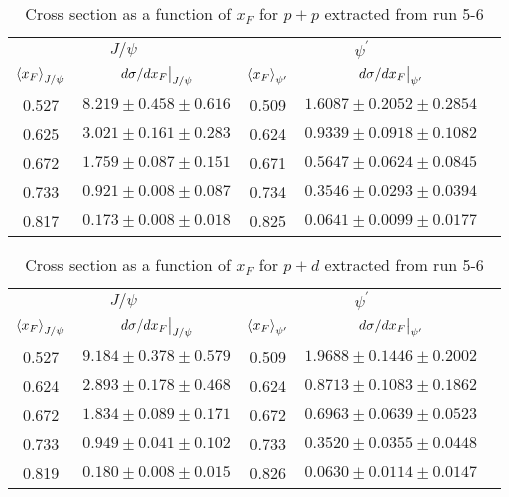 \documentclass[../main.tex]{subfiles}
\begin{document}
\begin{table}[h!]
\centering
\caption{Cross section as a function of $x_F$ for $p+p$ extracted from run 5-6}
\begin{tabular}{cc|ccc}
\hline
\multicolumn{2}{c|}{$J/\psi$}                               & \multicolumn{2}{c}{$\psi^{\prime}$}                                &  \\ \cline{1-4}
$\expval{x_F}_{J/\psi}$    & $\eval{d\sigma/dx_F}_{J/\psi}$ & $\expval{x_F}_{\psi^\prime}$ & $\eval{d\sigma/dx_F}_{\psi^\prime}$ &  \\ \cline{1-4}
\multicolumn{1}{c|}{0.527} & $8.219\pm0.458\pm0.616$        & \multicolumn{1}{c|}{0.509}   & $1.6087\pm0.2052\pm0.2854$          &  \\
\multicolumn{1}{c|}{0.625} & $3.021\pm0.161\pm0.283$        & \multicolumn{1}{c|}{0.624}   & $0.9339\pm0.0918\pm0.1082$          &  \\
\multicolumn{1}{c|}{0.672} & $1.759\pm0.087\pm0.151$        & \multicolumn{1}{c|}{0.671}   & $0.5647\pm0.0624\pm0.0845$          &  \\
\multicolumn{1}{c|}{0.733} & $0.921\pm0.008\pm0.087$        & \multicolumn{1}{c|}{0.734}   & $0.3546\pm0.0293\pm0.0394$          &  \\
\multicolumn{1}{c|}{0.817} & $0.173\pm0.008\pm0.018$        & \multicolumn{1}{c|}{0.825}   & $0.0641\pm0.0099\pm0.0177$          &  \\ \cline{1-4}
\end{tabular}
\end{table}
\begin{table}[h!]
\centering
\caption{Cross section as a function of $x_F$ for $p+d$ extracted from run 5-6}
\begin{tabular}{cc|ccc}
\hline
\multicolumn{2}{c|}{$J/\psi$}                               & \multicolumn{2}{c}{$\psi^{\prime}$}                                &  \\ \cline{1-4}
$\expval{x_F}_{J/\psi}$    & $\eval{d\sigma/dx_F}_{J/\psi}$ & $\expval{x_F}_{\psi^\prime}$ & $\eval{d\sigma/dx_F}_{\psi^\prime}$ &  \\ \cline{1-4}
\multicolumn{1}{c|}{0.527} & $9.184\pm0.378\pm0.579$        & \multicolumn{1}{c|}{0.509}   & $1.9688\pm0.1446\pm0.2002$          &  \\
\multicolumn{1}{c|}{0.624} & $2.893\pm0.178\pm0.468$        & \multicolumn{1}{c|}{0.624}   & $0.8713\pm0.1083\pm0.1862$          &  \\
\multicolumn{1}{c|}{0.672} & $1.834\pm0.089\pm0.171$        & \multicolumn{1}{c|}{0.672}   & $0.6963\pm0.0639\pm0.0523$          &  \\
\multicolumn{1}{c|}{0.733} & $0.949\pm0.041\pm0.102$        & \multicolumn{1}{c|}{0.733}   & $0.3520\pm0.0355\pm0.0448$          &  \\
\multicolumn{1}{c|}{0.819} & $0.180\pm0.008\pm0.015$        & \multicolumn{1}{c|}{0.826}   & $0.0630\pm0.0114\pm0.0147$          &  \\ \cline{1-4}
\end{tabular}
\end{table}
\end{document}
